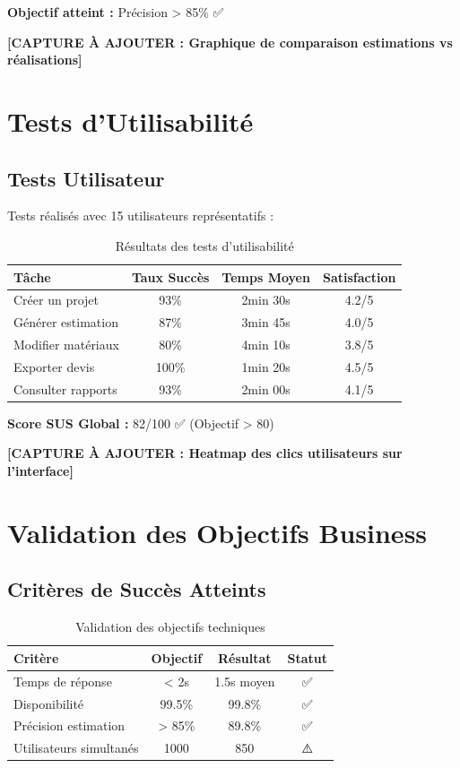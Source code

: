 \textbf{Objectif atteint :} Précision > 85\% ✅

\textbf{[CAPTURE À AJOUTER : Graphique de comparaison estimations vs réalisations]}

\section{Tests d'Utilisabilité}

\subsection{Tests Utilisateur}

Tests réalisés avec 15 utilisateurs représentatifs :

\begin{table}[h]
\centering
\begin{tabular}{|l|c|c|c|}
\hline
\textbf{Tâche} & \textbf{Taux Succès} & \textbf{Temps Moyen} & \textbf{Satisfaction} \\
\hline
Créer un projet & 93\% & 2min 30s & 4.2/5 \\
\hline
Générer estimation & 87\% & 3min 45s & 4.0/5 \\
\hline
Modifier matériaux & 80\% & 4min 10s & 3.8/5 \\
\hline
Exporter devis & 100\% & 1min 20s & 4.5/5 \\
\hline
Consulter rapports & 93\% & 2min 00s & 4.1/5 \\
\hline
\end{tabular}
\caption{Résultats des tests d'utilisabilité}
\end{table}

\textbf{Score SUS Global :} 82/100 ✅ (Objectif > 80)

\textbf{[CAPTURE À AJOUTER : Heatmap des clics utilisateurs sur l'interface]}

\section{Validation des Objectifs Business}

\subsection{Critères de Succès Atteints}

\begin{table}[h]
\centering
\begin{tabular}{|l|c|c|c|}
\hline
\textbf{Critère} & \textbf{Objectif} & \textbf{Résultat} & \textbf{Statut} \\
\hline
Temps de réponse & < 2s & 1.5s moyen & ✅ \\
\hline
Disponibilité & 99.5\% & 99.8\% & ✅ \\
\hline
Précision estimation & > 85\% & 89.8\% & ✅ \\
\hline
Utilisateurs simultanés & 1000 & 850 & ⚠️ \\
\hline
\end{tabular}
\caption{Validation des objectifs techniques}
\end{table}

